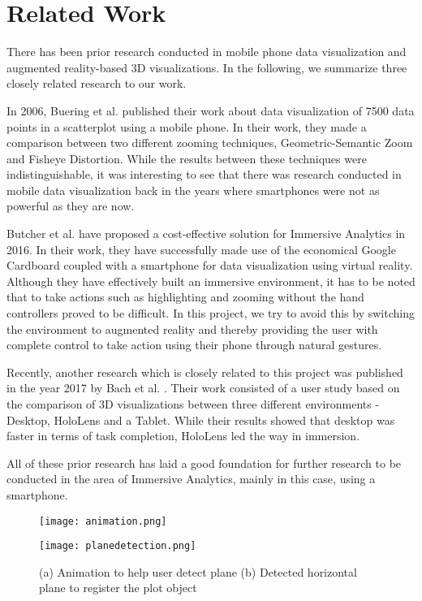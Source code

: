 \documentclass[journal]{vgtc}                %
\begin{document}
\section{Related Work}

There has been prior research conducted in mobile phone data visualization and augmented reality-based 3D visualizations. In the following, we summarize three closely related research to our work.

In 2006, Buering et al. \cite{buering2006user} published their work about data visualization of 7500 data points in a scatterplot using a mobile phone. In their work, they made a comparison between two different zooming techniques, Geometric-Semantic Zoom and Fisheye Distortion. While the results between these techniques were indistinguishable, it was interesting to see that there was research conducted in mobile data visualization back in the years where smartphones were not as powerful as they are now.

Butcher et al. \cite{butcher2016immersive} have proposed a cost-effective solution for Immersive Analytics in 2016. In their work, they have successfully made use of the economical Google Cardboard coupled with a smartphone for data visualization using virtual reality. Although they have effectively built an immersive environment, it has to be noted that to take actions such as highlighting and zooming without the hand controllers proved to be difficult. In this project, we try to avoid this by switching the environment to augmented reality and thereby providing the user with complete control to take action using their phone through natural gestures.

Recently, another research which is closely related to this project was published in the year 2017 by Bach et al. \cite{bach2017hologram}. Their work consisted of a user study based on the comparison of 3D visualizations between three different environments - Desktop, HoloLens and a Tablet. While their results showed that desktop was faster in terms of task completion, HoloLens led the way in immersion.

All of these prior research has laid a good foundation for further research to be conducted in the area of Immersive Analytics, mainly in this case, using a smartphone.

\begin{figure}[ht]
    \begin{minipage}[b]{0.45\linewidth}
        \centering
        \texttt{[image: animation.png]}
        \subcaption{}
    \end{minipage}
    \hspace{0.5cm}
    \begin{minipage}[b]{0.45\linewidth}
        \centering
        \texttt{[image: planedetection.png]}
       \subcaption{}
    \end{minipage}
    \caption{(a) Animation to help user detect plane (b) Detected horizontal plane to register the plot object}
\end{figure}
\end{document}
